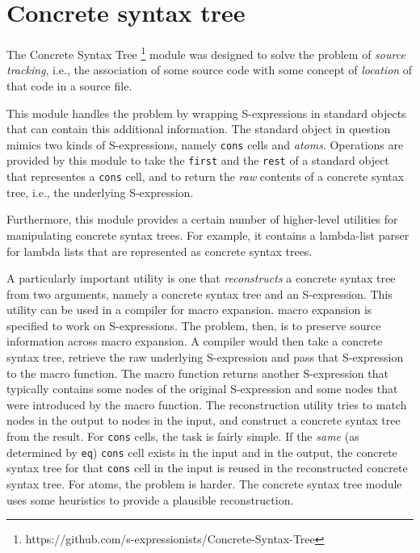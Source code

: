 \chapter{Concrete syntax tree}
\label{chap-concrete-syntax-tree}

The Concrete Syntax Tree%
\footnote{https://github.com/s-expressionists/Concrete-Syntax-Tree}
module was designed to solve the problem of \emph{source tracking},
i.e., the association of some source code with some concept of
\emph{location} of that code in a source file.

This module handles the problem by wrapping S-expressions in standard
objects that can contain this additional information.  The standard
object in question mimics two kinds of S-expressions, namely
\texttt{cons} cells and \emph{atoms}.  Operations are provided by this
module to take the \texttt{first} and the \texttt{rest} of a standard
object that representes a \texttt{cons} cell, and to return the
\emph{raw} contents of a concrete syntax tree, i.e., the underlying
S-expression.

Furthermore, this module provides a certain number of higher-level
utilities for manipulating concrete syntax trees.  For example, it
contains a lambda-list parser for lambda lists that are represented as
concrete syntax trees.

A particularly important utility is one that \emph{reconstructs} a
concrete syntax tree from two arguments, namely a concrete syntax tree
and an S-expression.  This utility can be used in a compiler for macro
expansion.  \commonlisp{} macro expansion is specified to work on
S-expressions.  The problem, then, is to preserve source information
across macro expansion.  A compiler would then take a concrete syntax
tree, retrieve the raw underlying S-expression and pass that
S-expression to the macro function.  The macro function returns
another S-expression that typically contains some nodes of the
original S-expression and some nodes that were introduced by the macro
function.  The reconstruction utility tries to match nodes in the
output to nodes in the input, and construct a concrete syntax tree
from the result.  For \texttt{cons} cells, the task is fairly simple.
If the \emph{same} (as determined by \texttt{eq}) \texttt{cons} cell
exists in the input and in the output, the concrete syntax tree for
that \texttt{cons} cell in the input is reused in the reconstructed
concrete syntax tree.  For atoms, the problem is harder.  The concrete
syntax tree module uses some heuristics to provide a plausible
reconstruction.

